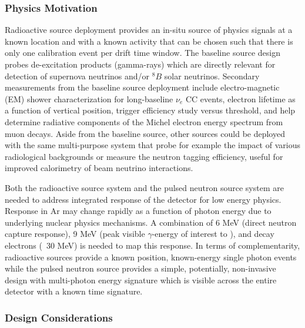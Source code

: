

\subsubsection{Physics Motivation}

Radioactive source deployment provides an in-situ source of physics signals at a known location and with a known activity that can be chosen such that there is only one calibration event per drift time window. The baseline source design probes de-excitation products (gamma-rays) which are directly relevant for detection of supernova neutrinos and/or $^{8}B$ solar neutrinos. Secondary measurements from the baseline source deployment include electro-magnetic (EM) shower characterization for long-baseline $\nu_e$ CC events, electron lifetime as a function of   vertical position, trigger efficiency study versus threshold, and help determine radiative components of the Michel electron energy spectrum from muon decays. Aside from the baseline source, other sources could be deployed with the same multi-purpose system that probe for example the impact of various radiological backgrounds or measure the neutron tagging efficiency, useful for improved calorimetry of beam neutrino interactions.

Both the radioactive source system and the pulsed neutron source system are needed to address integrated response of the detector for low energy physics. Response in Ar may change rapidly as a function of photon energy due to underlying nuclear physics mechanisms. A combination of 6 MeV (direct neutron capture response), 9 MeV (peak visible $\gamma$-energy of interest to ), and decay electrons (~30 MeV) is needed to map this response. In terms of complementarity, radioactive sources provide a known position, known-energy single photon events while the pulsed neutron source provides a simple, potentially, non-invasive design with multi-photon energy signature which is visible across the entire detector with a known time signature.


\subsubsection{Design Considerations}

